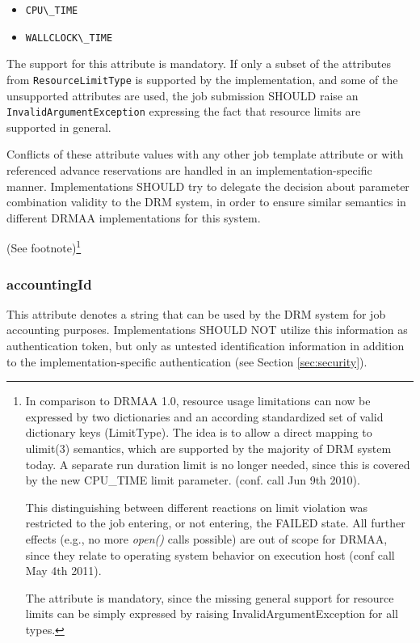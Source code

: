 \documentclass{article}
\newcommand{\h}[1]{\lstinline|#1|}
\newcommand{\rat}[1]{ {\tiny(See footnote)}\footnote{#1} }
\begin{document}
\begin{itemize}
\item \h{CPU\_TIME}
\item \h{WALLCLOCK\_TIME}
\end{itemize} 

The support for this attribute is mandatory. If only a subset of the attributes from \h{ResourceLimitType} is supported by the implementation, and some of the unsupported attributes are used, the job submission SHOULD raise an \h{InvalidArgumentException} expressing the fact that resource limits are supported in general. 

Conflicts of these attribute values with any other job template attribute or with referenced advance reservations are handled in an implementation-specific manner. Implementations SHOULD try to delegate the decision about parameter combination validity to the DRM system, in order to ensure similar semantics in different DRMAA implementations for this system.

\rat{
In comparison to DRMAA 1.0, resource usage limitations can now be expressed by two dictionaries and an according standardized set of valid dictionary keys (LimitType). The idea is to allow a direct mapping to ulimit(3) semantics, which are supported by the majority of DRM system today. A separate run duration limit is no longer needed, since this is covered by the new CPU\_TIME limit parameter. (conf. call Jun 9th 2010). 

This distinguishing between different reactions on limit violation was restricted to the job entering, or not entering, the FAILED state. All further effects (e.g., no more \emph{open()} calls possible) are out of scope for DRMAA, since they relate to operating system behavior on  execution host (conf call May 4th 2011). 

The attribute is mandatory, since the missing general support for resource limits can be simply expressed by raising InvalidArgumentException for all types.
} 

\subsubsection{accountingId}

This attribute denotes a string that can be used by the DRM system for job accounting purposes. Implementations SHOULD NOT utilize this information as authentication token, but only as untested identification information in addition to the implementation-specific authentication (see Section \ref{sec:security}).
\end{document}
